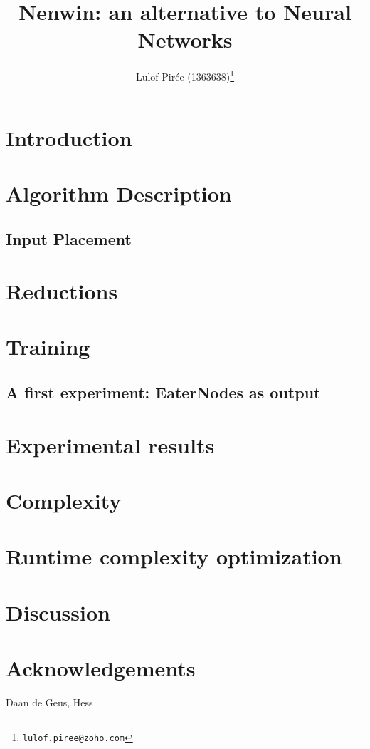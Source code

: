\documentclass{scrartcl}
\title{Nenwin: an alternative to Neural Networks}
\author{{Lulof Pirée (1363638)\footnote{\texttt{lulof.piree@zoho.com}}}}
\newcommand{\hl}[1]{{\color{red}#1}} %
\begin{document}
    \maketitle
    
    
    
    \section{Introduction}
    
    
    \section{Algorithm Description}
    
    
    \subsection{Input Placement}
    
    
    \section{Reductions}
    
    
    \section{Training}
    
    
    \subsection{A first experiment: EaterNodes as output}
    
    
    \section{Experimental results}
    
    
    \section{Complexity}
    
    
    \section{Runtime complexity optimization}
    

    \section{Discussion}
    
    
    \section{Acknowledgements}
    \hl{Daan de Geus, Hess}
    \printbibliography[
    heading=bibintoc,
    title={References}
    ]
    
    \appendix
    
    
\end{document}

